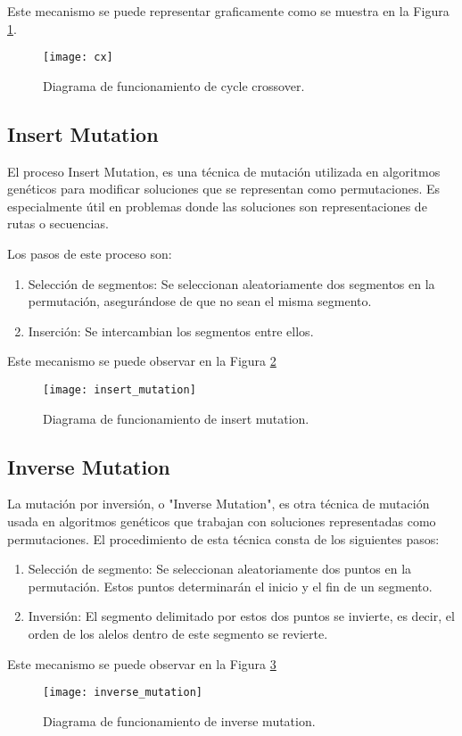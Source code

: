 Este mecanismo se puede representar graficamente como se muestra en la Figura \ref{fig:Cx}.

\begin{figure}[htbp]
	\centering
	\texttt{[image: cx]}
	\caption{Diagrama de funcionamiento de cycle crossover.}
	\label{fig:Cx}
\end{figure}


\FloatBarrier
\subsection{Insert Mutation}
El proceso Insert Mutation, es una técnica de mutación utilizada en algoritmos genéticos para modificar soluciones que se representan como permutaciones. Es especialmente útil en problemas donde las soluciones son representaciones de rutas o secuencias.

Los pasos de este proceso son:
\begin{enumerate}
	\item Selección de segmentos: Se seleccionan aleatoriamente dos segmentos en la permutación, asegurándose de que no sean el misma segmento.
	\item Inserción: Se intercambian los segmentos entre ellos.
\end{enumerate}

Este mecanismo se puede observar en la Figura \ref{fig:IsrM}

\begin{figure}[htbp]
	\centering
	\texttt{[image: insert\_mutation]}
	\caption{Diagrama de funcionamiento de insert mutation.}
	\label{fig:IsrM}
\end{figure}


\subsection{Inverse Mutation}
La mutación por inversión, o "Inverse Mutation", es otra técnica de mutación usada en algoritmos genéticos que trabajan con soluciones representadas como permutaciones. El procedimiento de esta técnica consta de los siguientes pasos:

\begin{enumerate}
	\item Selección de segmento: Se seleccionan aleatoriamente dos puntos en la permutación. Estos puntos determinarán el inicio y el fin de un segmento.
	\item Inversión: El segmento delimitado por estos dos puntos se invierte, es decir, el orden de los alelos dentro de este segmento se revierte.
\end{enumerate}

Este mecanismo se puede observar en la Figura \ref{fig:InvM}

\begin{figure}[htbp]
	\centering
	\texttt{[image: inverse\_mutation]}
	\caption{Diagrama de funcionamiento de inverse mutation.}
	\label{fig:InvM}
\end{figure}
